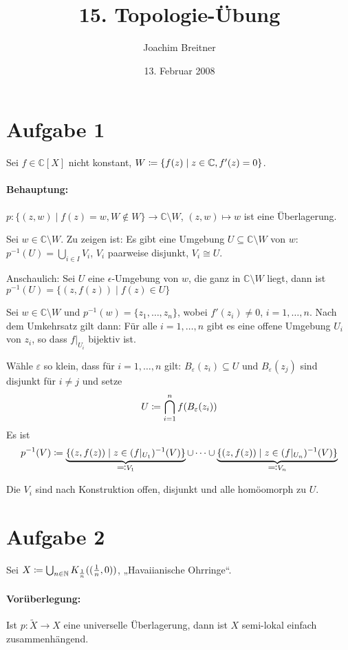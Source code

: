\documentclass{article}
\title{15. Topologie-Übung}
\author{Joachim Breitner}
\date{13. Februar 2008}
\begin{document}
\maketitle

\section*{Aufgabe 1}


Sei $f \in \mathbb C[X]$ nicht konstant, $W\mathrel{\mbox{$\coloneqq$}} \{ f(z) \mid z\in \mathbb C, f'(z)=0\}$.

\paragraph{Behauptung:} $p:\{(z,w) \mid f(z)=w, W\notin W\} \to \mathbb C\setminus W$, $(z,w)\mapsto w$ ist eine Überlagerung.

Sei $w\in \mathbb C \setminus W$. Zu zeigen ist: Es gibt eine Umgebung $U\subseteq \mathbb C\setminus W$ von $w$: $p^{-1}(U) = \bigcup_{i\in I}V_i$, $V_i$ paarweise disjunkt, $V_i\cong U$.

Anschaulich: Sei $U$ eine $\epsilon$-Umgebung von $w$, die ganz in $\mathbb C\setminus W$ liegt, dann ist $p^{-1}(U)=\{(z,f(z))\mid f(z)\in U\}$

Sei $w\in \mathbb C\setminus W$ und $p^{-1}(w)=\{z_1,\ldots,z_n\}$, wobei $f'(z_i) \ne 0$, $i=1,\ldots,n$. Nach dem Umkehrsatz gilt dann: Für alle $i=1,\ldots,n$ gibt es eine offene Umgebung $U_i$ von $z_i$, so dass $f|_{U_i}$ bijektiv ist.

Wähle $\varepsilon$ so klein, dass für $i=1,\ldots,n$ gilt: $B_\varepsilon(z_i) \subseteq U$ und $B_\varepsilon(z_j)$ sind disjunkt für $i\ne j$ und setze
\[
U \mathrel{\mbox{$\coloneqq$}} \bigcap_{i=1}^n f(B_\varepsilon(z_i))
\]
Es ist 
\[
p^{-1}(V)\mathrel{\mbox{$\coloneqq$}}
\underbrace{\{(z,f(z)) \mid z\in (f|_{U_1})^{-1}(V)\}}_{\mathrel{\mbox{$\eqqcolon$}} V_1}
\cup \cdots \cup
\underbrace{\{(z,f(z)) \mid z\in (f|_{U_n})^{-1}(V)\}}_{\mathrel{\mbox{$\eqqcolon$}} V_n}
\]

Die $V_i$ sind nach Konstruktion offen, disjunkt und alle homöomorph zu $U$.

\section*{Aufgabe 2}
 Sei $X\mathrel{\mbox{$\coloneqq$}} \bigcup_{n\in \mathbb N}K_{\frac 1n}( (\frac1n,0) )$, „Havaiianische Ohrringe“.

\paragraph{Vorüberlegung:} 
Ist $p:\tilde X\to X$ eine universelle Überlagerung, dann ist $X$ semi-lokal einfach zusammenhängend.
\end{document}
